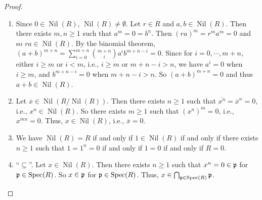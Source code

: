 \begin{proof}
    \begin{enumerate}
        \item Since $0 \in \operatorname{Nil}(R)$, $\operatorname{Nil}(R) \neq \emptyset$. Let $r \in R$ and $a,b \in \operatorname{Nil}(R)$. Then there exists $m,n \geq 1$ such that $a^m = 0 = b^n$. Then $(ra)^m = r^ma^m = 0$ and so $ra \in \operatorname{Nil}(R)$. By the binomial theorem, $(a+b)^{m+n} = \sum_{i=0}^{m+n} \binom {m+n} i a^i b^{m+n-i} = 0$. Since for $i = 0,\cdots,m+n$, either $i \geq m$ or $i < m$, i.e., $i \geq m$ or $m+n-i > n$, we have $a^i = 0$ when $i \geq m$, and $b^{m+n-i} = 0 $ when $m + n-i > n$. So $(a+b)^{m+n} = 0$ and thus $a+b \in \operatorname{Nil}(R)$.
        \item Let $\overbar x \in \operatorname{Nil}(R/\operatorname{Nil}(R))$. Then there exists $n \geq 1$ such that $\overbar {x^n} = \overbar x^n = 0$, i.e., $x^n \in \operatorname{Nil}(R)$. So there exists $m \geq 1$ such that $(x^n)^m = 0$, i.e., $x^{mn} = 0$. Thus, $x \in \operatorname{Nil}(R)$, i.e., $\overbar x = 0$.
        \item  We have $\operatorname{Nil}(R) = R$ if and only if $1 \in \operatorname{Nil}(R)$ if and only if there exists $n \geq 1$ such that $1 = 1^n = 0$ if and only if $1 = 0$ if and only if $R = 0$.
        \item ``$\subseteq$''. Let $x \in \operatorname{Nil}(R)$. Then there exists $n \geq 1$ such that $x^n = 0 \in \mathfrak{p}$ for $\mathfrak{p} \in \operatorname{Spec}(R)$. So $x \in \mathfrak{p}$ for $\mathfrak{p} \in \operatorname{Spec}(R)$. Thus, $x \in \bigcap_{\mathfrak{p} \in \operatorname{Spec}(R)} \mathfrak{p}$. \par

\end{enumerate}
\end{proof}
